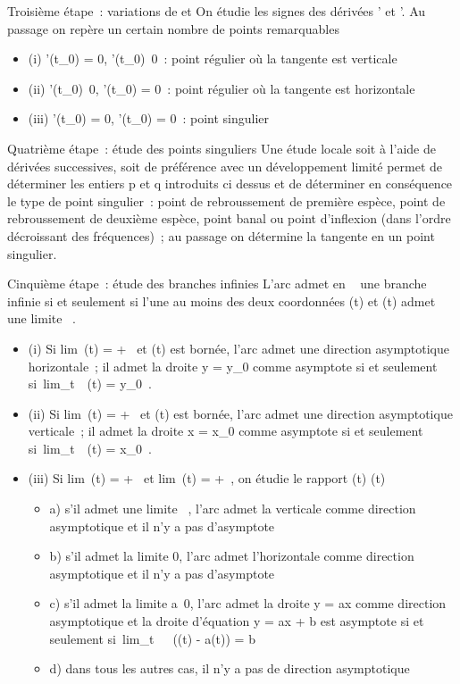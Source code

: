 \documentclass[]{article}
\begin{document}
Troisième étape~: variations de \phi et \psi On étudie les signes des dérivées
\phi' et \psi'. Au passage on repère un certain nombre de points remarquables

\begin{itemize}
\itemsep1pt\parskip0pt
\item
  (i) \phi'(t_0) = 0,
  \psi'(t_0)\neq~0~: point régulier où la
  tangente est verticale
\item
  (ii) \phi'(t_0)\neq~0, \psi'(t_0) =
  0~: point régulier où la tangente est horizontale
\item
  (iii) \phi'(t_0) = 0, \psi'(t_0) = 0~: point singulier
\end{itemize}

Quatrième étape~: étude des points singuliers Une étude locale soit à
l'aide de dérivées successives, soit de préférence avec un développement
limité permet de déterminer les entiers p et q introduits ci dessus et
de déterminer en conséquence le type de point singulier~: point de
rebroussement de première espèce, point de rebroussement de deuxième
espèce, point banal ou point d'inflexion (dans l'ordre décroissant des
fréquences)~; au passage on détermine la tangente en un point singulier.

Cinquième étape~: étude des branches infinies L'arc admet en \alpha~
\in\overlineD une branche infinie si et seulement si
l'une au moins des deux coordonnées \phi(t) et \psi(t) admet une limite \infty~.

\begin{itemize}
\itemsep1pt\parskip0pt
\item
  (i) Si lim~\phi(t) = +\infty~ et
  \psi(t) est bornée, l'arc admet une direction asymptotique horizontale~;
  il admet la droite y = y_0 comme asymptote si et seulement
  si~lim_t\rightarrow~\alpha~\psi(t) = y_0~.
\item
  (ii) Si lim~\psi(t) = +\infty~ et
  \phi(t) est bornée, l'arc admet une direction asymptotique verticale~; il
  admet la droite x = x_0 comme asymptote si et seulement
  si~lim_t\rightarrow~\alpha~\phi(t) = x_0~.
\item
  (iii) Si lim~\phi(t) = +\infty~ et
  lim~\psi(t) = +\infty~, on étudie
  le rapport  \psi(t) \over \phi(t)

  \begin{itemize}
  \itemsep1pt\parskip0pt
  \item
    a) s'il admet une limite \infty~, l'arc admet la verticale comme direction
    asymptotique et il n'y a pas d'asymptote
  \item
    b) s'il admet la limite 0, l'arc admet l'horizontale comme direction
    asymptotique et il n'y a pas d'asymptote
  \item
    c) s'il admet la limite a\neq~0, l'arc admet
    la droite y = ax comme direction asymptotique et la droite
    d'équation y = ax + b est asymptote si et seulement
    si~lim_t\rightarrow~\alpha~~(\psi(t) - a\phi(t)) = b
  \item
    d) dans tous les autres cas, il n'y a pas de direction asymptotique
  \end{itemize}
\end{itemize}
\end{document}
